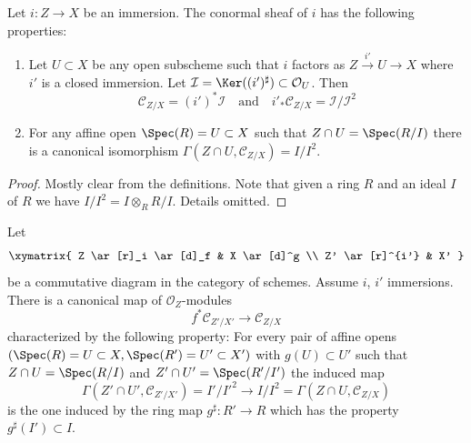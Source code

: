 \begin{lemma}
\label{lemma-affine-conormal}
Let $i : Z \to X$ be an immersion. The conormal sheaf
of $i$ has the following properties:
\begin{enumerate}
\item Let $U \subset X$ be any open subscheme such that $i$
factors as $Z \xrightarrow{i'} U \to X$ where $i'$ is a closed
immersion. Let $\mathcal{I} = \Ker((i')^\sharp) \subset \mathcal{O}_U$.
Then
$$
\mathcal{C}_{Z/X} = (i')^*\mathcal{I}\quad\text{and}\quad
i'_*\mathcal{C}_{Z/X} = \mathcal{I}/\mathcal{I}^2
$$
\item
For any affine open $\Spec(R) = U \subset X$
such that $Z \cap U = \Spec(R/I)$ there is a
canonical isomorphism
$\Gamma(Z \cap U, \mathcal{C}_{Z/X}) = I/I^2$.
\end{enumerate}
\end{lemma}

\begin{proof}
Mostly clear from the definitions. Note that given a ring $R$ and
an ideal $I$ of $R$ we have $I/I^2 = I \otimes_R R/I$. Details omitted.
\end{proof}

\begin{lemma}
\label{lemma-conormal-functorial}
Let
$$
\xymatrix{
Z \ar[r]_i \ar[d]_f & X \ar[d]^g \\
Z' \ar[r]^{i'} & X'
}
$$
be a commutative diagram in the category of schemes.
Assume $i$, $i'$ immersions. There is a canonical map
of $\mathcal{O}_Z$-modules
$$
f^*\mathcal{C}_{Z'/X'}
\longrightarrow
\mathcal{C}_{Z/X}
$$
characterized by the following property: For every pair of affine opens
$(\Spec(R) = U \subset X, \Spec(R') = U' \subset X')$ with
$g(U) \subset U'$ such that
$Z \cap U = \Spec(R/I)$ and $Z' \cap U' = \Spec(R'/I')$
the induced map
$$
\Gamma(Z' \cap U', \mathcal{C}_{Z'/X'}) = I'/I'^2
\longrightarrow
I/I^2 = \Gamma(Z \cap U, \mathcal{C}_{Z/X})
$$
is the one induced by the ring map $g^\sharp : R' \to R$ which
has the property $g^\sharp(I') \subset I$.
\end{lemma}

